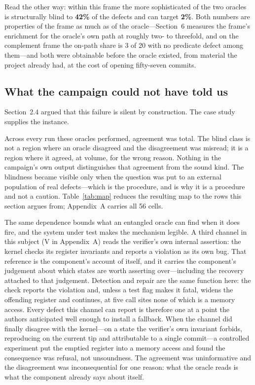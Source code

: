 Read the other way: within this frame the more sophisticated of the two oracles is
structurally blind to \textbf{42\%} of the defects and can target \textbf{2\%}. Both
numbers are properties of the frame as much as of the oracle---Section~6 measures the
frame's enrichment for the oracle's own path at roughly two- to threefold, and on the
complement frame the on-path share is 3 of 20 with no predicate defect among
them---and both were obtainable before the oracle existed, from material the project
already had, at the cost of opening fifty-seven commits.

\subsection{What the campaign could not have told us}

Section~2.4 argued that this failure is silent by construction. The case study
supplies the instance.

Across every run these oracles performed, agreement was total. The blind class is
not a region where an oracle disagreed and the disagreement was misread; it is a
region where it agreed, at volume, for the wrong reason. Nothing in the campaign's
own output distinguishes that agreement from the sound kind. The blindness became
visible only when the question was put to an external population of real
defects---which is the procedure, and is why it is a procedure and not a caution.
Table~\ref{tab:map} reduces the resulting map to the rows this section argues from;
Appendix~A carries all 56 cells.

The same dependence bounds what an entangled oracle can find when it does fire, and
the system under test makes the mechanism legible. A third channel in this subject (V in
Appendix~A) reads the verifier's own internal assertion: the kernel checks its register
invariants and reports a violation as its own bug. That reference is the component's
account of itself, and it carries the component's judgement about which states are
worth asserting over---including the recovery attached to that judgement. Detection
and repair are the same function here: the check reports the violation and, unless a
test flag makes it fatal, widens the offending register and continues, at five call
sites none of which is a memory access. Every defect this channel can report is
therefore one at a point the authors anticipated well enough to install a fallback.
When the channel did finally disagree with the kernel---on a state the verifier's own
invariant forbids, reproducing on the current tip and attributable to a single
commit---a controlled experiment put the emptied register into a memory access and
found the consequence was refusal, not unsoundness. The agreement was uninformative
and the disagreement was inconsequential for one reason: what the oracle reads is
what the component already says about itself.

